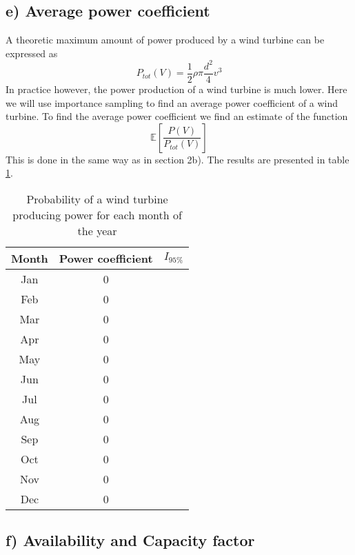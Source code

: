 \documentclass[a4paper]{article}
\begin{document}
\subsection*{e) Average power coefficient}
A theoretic maximum amount of power produced by a wind turbine can be expressed as
\begin{equation}
    P_{tot}(V) = \frac{1}{2}\rho\pi\frac{d^2}{4}v^3
\end{equation}
In practice however, the power production of a wind turbine is much lower. Here we will use importance sampling to find an average power coefficient of a wind turbine. To find the average power coefficient we find an estimate of the function
\begin{equation}
  \mathbb{E}[\frac{P(V)}{P_{tot}(V)}]
\end{equation}
This is done in the same way as in section 2b). The results are presented in table \ref{powercoeff}.
\begin{table}
    \centering
    \caption{Probability of a wind turbine producing power for each month of the year}
    \label{powercoeff}
    \begin{tabular}{|c|| c c ||}
        \hline
        Month & Power coefficient & $I_{95\%}$ \\
        \hline
        Jan & 0 &\\
        \hline
        Feb & 0 &\\
        \hline
        Mar & 0 &\\
        \hline
        Apr & 0 &\\
        \hline
        May & 0 &\\
        \hline
        Jun & 0 &\\
        \hline
        Jul & 0 &\\
        \hline
        Aug & 0 &\\
        \hline
        Sep & 0 &\\
        \hline
        Oct & 0 &\\
        \hline
        Nov & 0 &\\
        \hline
        Dec & 0 &\\
        \hline

    \end{tabular}
\end{table}

\subsection*{f) Availability and Capacity factor}
\end{document}
